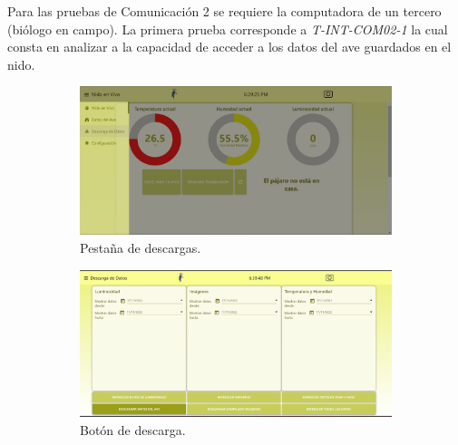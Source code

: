 
Para las pruebas de Comunicación 2 se requiere la computadora de un tercero (biólogo en campo). La primera prueba corresponde a \textit{T-INT-COM02-1} la cual consta en analizar a la capacidad de acceder a los datos del ave guardados en el nido.
\begin{figure}[H]
\centering
	\begin{subfigure}{0.49\textwidth}
		\centering
		\includegraphics[width=\linewidth]{ImagenesValidacion del prototipo/TINTCOM21a}		
		\caption{Pestaña de descargas.}
	\end{subfigure}\hfill
	\begin{subfigure}{0.49\textwidth}
		\centering
		\includegraphics[width=\linewidth]{ImagenesValidacion del prototipo/TINTCOM21b}
		\caption{Botón de descarga.}
	\end{subfigure}
	\caption*{}
\end{figure}
